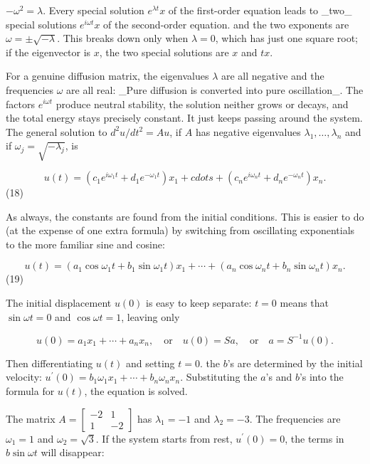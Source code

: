 \(-\omega^{2}=\lambda\). Every special solution \(e^{\lambda t}x\) of the first-order equation leads to _two_ special solutions \(e^{i\omega t}x\) of the second-order equation. and the two exponents are \(\omega=\pm\sqrt{-\lambda}\). This breaks down only when \(\lambda=0\), which has just one square root; if the eigenvector is \(x\), the two special solutions are \(x\) and \(tx\).

For a genuine diffusion matrix, the eigenvalues \(\lambda\) are all negative and the frequencies \(\omega\) are all real: _Pure diffusion is converted into pure oscillation_. The factors \(e^{i\omega t}\) produce neutral stability, the solution neither grows or decays, and the total energy stays precisely constant. It just keeps passing around the system. The general solution to \(d^{2}u/dt^{2}=Au\), if \(A\) has negative eigenvalues \(\lambda_{1},\ldots,\lambda_{n}\) and if \(\omega_{j}=\sqrt{-\lambda_{j}}\), is

\[u(t)=\left(c_{1}e^{i\omega_{1}t}+d_{1}e^{-\omega_{1}t}\right)x_{1}+cdots+\left( c_{n}e^{i\omega_{n}t}+d_{n}e^{-\omega_{n}t}\right)x_{n}.\] (18)

As always, the constants are found from the initial conditions. This is easier to do (at the expense of one extra formula) by switching from oscillating exponentials to the more familiar sine and cosine:

\[u(t)=(a_{1}\cos\omega_{1}t+b_{1}\sin\omega_{1}t)x_{1}+\cdots+(a_{n}\cos\omega_ {n}t+b_{n}\sin\omega_{n}t)x_{n}.\] (19)

The initial displacement \(u(0)\) is easy to keep separate: \(t=0\) means that \(\sin\omega t=0\) and \(\cos\omega t=1\), leaving only

\[u(0)=a_{1}x_{1}+\cdots+a_{n}x_{n},\quad\text{or}\quad u(0)=Sa,\quad\text{or} \quad a=S^{-1}u(0).\]

Then differentiating \(u(t)\) and setting \(t=0\). the \(b\)'s are determined by the initial velocity: \(u^{\prime}(0)=b_{1}\omega_{1}x_{1}+\cdots+b_{n}\omega_{n}x_{n}\). Substituting the \(a\)'s and \(b\)'s into the formula for \(u(t)\), the equation is solved.

The matrix \(A=\left[\begin{smallmatrix}-2&1\\ 1&-2\end{smallmatrix}\right]\) has \(\lambda_{1}=-1\) and \(\lambda_{2}=-3\). The frequencies are \(\omega_{1}=1\) and \(\omega_{2}=\sqrt{3}\). If the system starts from rest, \(u^{\prime}(0)=0\), the terms in \(b\sin\omega t\) will disappear:


